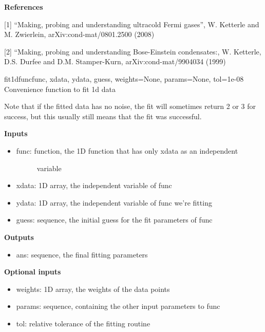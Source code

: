 \documentclass[letterpaper,10pt,english]{manual}
\begin{document}
\textbf{References}

{[}1{]} ``Making, probing and understanding ultracold Fermi gases'', W. Ketterle and
M. Zwierlein, arXiv:cond-mat/0801.2500 (2008)

{[}2{]} ``Making, probing and understanding Bose-Einstein condensates:, W. Ketterle,
D.S. Durfee and D.M. Stamper-Kurn, arXiv:cond-mat/9904034 (1999)

\hypertarget{fitfuncs.fit1dfunc}{}\begin{funcdesc}{fit1dfunc}{func, xdata, ydata, guess, weights=None, params=None, tol=1e-08}
Convenience function to fit 1d data

Note that if the fitted data has no noise, the fit will sometimes return
2 or 3 for success, but this usually still means that the fit was successful.

\textbf{Inputs}
\begin{itemize}
\item {} \begin{description}
\item[func: function, the 1D function that has only xdata as an independent]
variable

\end{description}

\item {} 
xdata: 1D array, the independent variable of func

\item {} 
ydata: 1D array, the independent variable of func we're fitting

\item {} 
guess: sequence, the initial guess for the fit parameters of func

\end{itemize}

\textbf{Outputs}
\begin{itemize}
\item {} 
ans: sequence, the final fitting parameters

\end{itemize}

\textbf{Optional inputs}
\begin{itemize}
\item {} 
weights: 1D array, the weights of the data points

\item {} 
params: sequence, containing the other input parameters to func

\item {} 
tol: relative tolerance of the fitting routine

\end{itemize}
\end{funcdesc}
\end{document}
